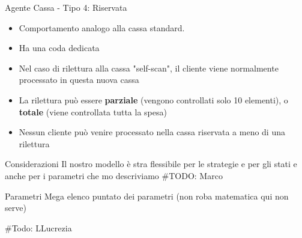 \begin{frame}{Agente Cassa - Tipo 4: Riservata}
	
	\begin{itemize}
		\item Comportamento analogo alla cassa standard.
		\item Ha una coda dedicata
		\item Nel caso di rilettura alla cassa "self-scan", il cliente viene normalmente processato in questa nuova cassa
		\item La rilettura può essere \textbf{parziale} (vengono controllati solo 10 elementi), o \textbf{totale} (viene controllata tutta la spesa)
		\item Nessun cliente può venire processato nella cassa riservata a meno di una rilettura
	\end{itemize}
\end{frame}




\begin{frame}{Considerazioni}
	\centering
	Il nostro modello è stra flessibile per le strategie e per gli stati e anche per i parametri che mo descriviamo
	\#TODO: Marco
\end{frame}




\begin{frame}{Parametri}
	\centering
	Mega elenco puntato dei parametri (non roba matematica qui non serve)
	
	\#Todo: LLucrezia
\end{frame}